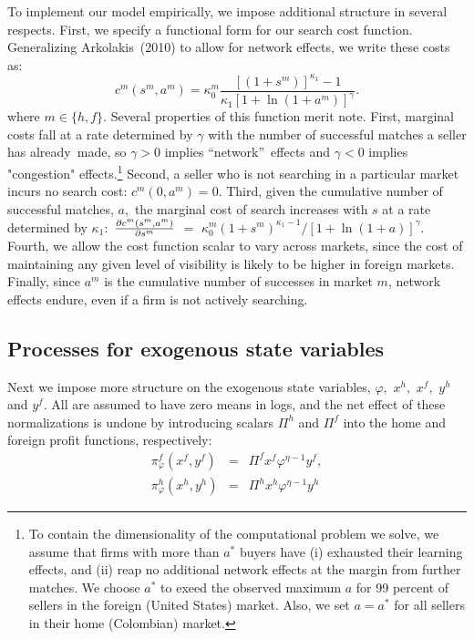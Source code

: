 \documentclass[12pt]{article}
\begin{document}
To implement our model empirically, we impose additional structure in
several respects. First, we specify a functional form for our search cost
function. Generalizing Arkolakis\ (2010) to allow for network effects, we
write these costs as:%
\begin{equation}
c^{m}(s^{m},a^{m})=\kappa _{0}^{m}\frac{\left[ (1+s^{m})\right] ^{\kappa
_{1}}-1}{\kappa _{1}\left[ 1+\ln (1+a^{m})\right] ^{\gamma }}.
\label{cost of effort}
\end{equation}%
where $m\in \{h,f\}.$ Several properties of this function merit note. First,
marginal costs fall at a rate determined by $\gamma $ with the number of
successful matches a seller has already\ made, so $\gamma >0$ implies
\textquotedblleft network\textquotedblright\ effects and $\gamma <0$ implies
"congestion" effects.\footnote{%
To contain the dimensionality of the computational problem we solve, we
assume that firms with more than $a^{\ast }$ buyers have (i) exhausted their
learning effects, and (ii) reap no additional network effects at the margin
from further matches. We choose $a^{\ast }$ to exeed the observed maximum $a$
for 99 percent of sellers in the foreign (United States) market. Also, we
set $a=a^{\ast }$ for all sellers in their home (Colombian) market.\medskip}
Second, a seller who is not searching in a particular market incurs no
search cost: $c^{m}(0,a^{m})=0.$ Third, given the cumulative number of
successful matches, $a,$ the marginal cost of search increases with $s$ at a
rate determined by $\kappa _{1}:$ $\frac{\partial c^{m}(s^{m},a^{m})}{%
\partial s^{m}}$ $=$ $\kappa _{0}^{m}(1+s^{m})^{\kappa _{1}-1}/\left[ 1+\ln
(1+a)\right] ^{\gamma }.$ Fourth, we allow the cost function scalar to vary
across markets, since the cost of maintaining any given level of visibility
is likely to be higher in foreign markets. Finally, since $a^{m}$ is the
cumulative number of successes in market $m$, network effects endure, even
if a firm is not actively searching.

\subsection{Processes for exogenous state variables}

Next we impose more structure on the exogenous state variables, $\varphi ,$ $%
x^{h},$ $x^{f},$ $y^{h}$ and $y^{f}.$ All are assumed to have zero means in
logs, and the net effect of these normalizations is undone by introducing
scalars $\Pi ^{h}$ and $\Pi ^{f}$ into the home and foreign profit
functions, respectively:%
\begin{eqnarray}
\pi _{\varphi }^{f}(x^{f},y^{f}) &=&\Pi ^{f}x^{f}\varphi ^{\eta -1}y^{f},
\label{profit3_f} \\
\pi _{\varphi }^{h}(x^{h},y^{h}) &=&\Pi ^{h}x^{h}\varphi ^{\eta -1}y^{h}
\label{profit3_h}
\end{eqnarray}
\end{document}
